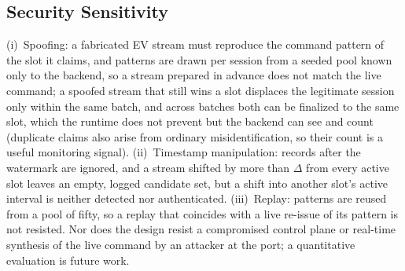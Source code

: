 \documentclass{ieeeaccess}
\newif\ifhighlight \highlightfalse
\DeclareRobustCommand{\revised}[1]{\ifhighlight{\color{blue}#1}\else{\color{.}#1}\fi}
\begin{document}
    \subsection{\revised{Security Sensitivity}}
    \revised{(i)~Spoofing: a fabricated EV stream must reproduce the command pattern of the slot it claims, and patterns are drawn per session from a seeded pool known only to the backend, so a stream prepared in advance does not match the live command; a spoofed stream that still wins a slot displaces the legitimate session only within the same batch, and across batches both can be finalized to the same slot, which the runtime does not prevent but the backend can see and count (duplicate claims also arise from ordinary misidentification, so their count is a useful monitoring signal).
    (ii)~Timestamp manipulation: records after the watermark are ignored, and a stream shifted by more than $\Delta$ from every active slot leaves an empty, logged candidate set, but a shift into another slot's active interval is neither detected nor authenticated.
    (iii)~Replay: patterns are reused from a pool of fifty, so a replay that coincides with a live re-issue of its pattern is not resisted.
    Nor does the design resist a compromised control plane or real-time synthesis of the live command by an attacker at the port; a quantitative evaluation is future work.}
\end{document}
